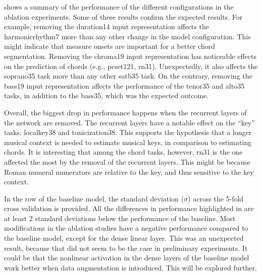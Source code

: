 

 shows a summary of the performance of the
different configurations in the ablation experiments. Some
of these results confirm the expected results. For example,
removing the \gls{duration14} input representation affects
the \gls{harmonicrhythm7} more than any other change in the
model configuration. This might indicate that measure onsets
are important for a better chord segmentation. Removing the
\gls{chroma19} input representation has noticeable effects
on the prediction of chords (e.g., \gls{pcset121},
\gls{rn31}). Unexpectedly, it also affects the
\gls{soprano35} task more than any other \gls{satb35} task.
On the contrary, removing the \gls{bass19} input
representation affects the performance of the \gls{tenor35}
and \gls{alto35} tasks, in addition to the \gls{bass35},
which was the expected outcome.

Overall, the biggest drop in performance happens when the
recurrent layers of the network are removed. The recurrent
layers have a notable effect on the ``key'' tasks:
\gls{localkey38} and \gls{tonicization38}. This supports the
hypothesis that a longer musical context is needed to
estimate musical keys, in comparison to estimating chords.
It is interesting that among the chord tasks, however,
\gls{rn31} is the one affected the most by the removal of
the recurrent layers. This might be because Roman numeral
numerators are relative to the key, and thus sensitive to
the key context.

In the row of the baseline model, the standard deviation
($\sigma$) across the 5-fold cross validation is provided.
All the differences in performance highlighted in
 are at least 2 standard deviations below
the performance of the baseline. Most modifications in the
ablation studies have a negative performance compared to the
baseline model, except for the dense linear layer. This was
an unexpected result, because that did not seem to be the
case in preliminary experiments. It could be that the
nonlinear activation in the dense layers of the baseline
model work better when data augmentation is introduced. This
will be explored further.
